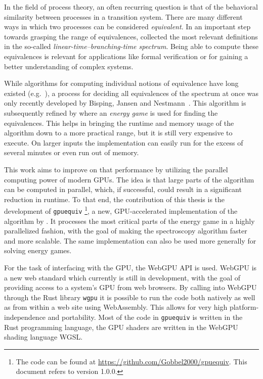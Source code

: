 In the field of process theory,
an often recurring question is that of
the behavioral similarity between processes in a transition system.
There are many different ways in which two processes can be considered
\emph{equivalent}.
In an important step towards grasping the range of equivalences,
\textcite{glabbeek1990spectrum} collected the most relevant definitions in the
so-called \emph{linear-time--branching-time spectrum}.
Being able to compute these equivalences is relevant for applications like
formal verification
or for gaining a better understanding of complex systems.

While algorithms for computing individual notions of equivalence
have long existed (e.g.~\cite{Blom2002}),
a process for deciding all equivalences of the spectrum at once
was only recently developed
by Bisping, Jansen and Nestmann~\cite{Bisping2022}.
This algorithm is subsequently refined by \textcite{bisping2023process}
where an \emph{energy game} is used for finding the equivalences.
This helps in bringing the runtime and memory usage of the algorithm down
to a more practical range,
but it is still very expensive to execute.
On larger inputs the implementation can easily run for the excess of several
minutes or even run out of memory.

This work aims to improve on that performance by utilizing the parallel
computing power of modern GPUs.
The idea is that large parts of the algorithm can be computed in parallel,
which, if successful, could result in a significant reduction in runtime.
To that end, the contribution of this thesis is the development
of \texttt{gpuequiv}%
\footnote{The code can be found at \url{https://github.com/Gobbel2000/gpuequiv}.
This document refers to version 1.0.0.},
a new, GPU-accelerated implementation
of the algorithm by \textcite{bisping2023process}.
It processes the most critical parts of the energy game in a highly
parallelized fashion,
with the goal of making the spectroscopy algorithm faster and more scalable.
The same implementation can also be used more generally for solving energy
games.

For the task of interfacing with the GPU,
the WebGPU API is used.
WebGPU is a new web standard which currently is still in development,
with the goal of providing access to a system's GPU from web browsers.
By calling into WebGPU through the Rust library \texttt{wgpu} it is possible to
run the code both natively as well as from within a web site using WebAssembly.
This allows for very high platform-independence and portability.
Most of the code in \texttt{gpuequiv} is written in the
Rust programming language,
the GPU shaders are written in the WebGPU shading language WGSL\@.

